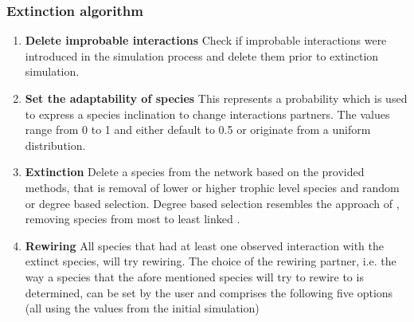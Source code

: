 \documentclass[12pt,a4paper]{article}
\begin{document}
\subsubsection{Extinction algorithm} \label{subsec:extc_alg}
\begin{enumerate} 
	\item \textbf{Delete improbable interactions} {\small Check if improbable interactions were introduced in the simulation process and delete them prior to extinction simulation.}
	\item \textbf{Set the adaptability of species} {\small This represents a probability which is used to express a species inclination to change interactions partners. The values range from 0 to 1 and either default to 0.5 or originate from a uniform distribution.}
	\item \label{itm:etxc} \textbf{Extinction} {\small Delete a species from the network based on the provided methods, that is removal of lower or higher trophic level species and random or degree based selection. Degree based selection resembles the approach of \citeauthor{Memmott2004}, removing species from most to least linked \parencite{Memmott2004}.}
	\item \label{itm:rew} \textbf{Rewiring} {\small All species that had at least one observed interaction with the extinct species, will try rewiring. The choice of the rewiring partner, i.e. the way a species that the afore mentioned species will try to rewire to is determined, can be set by the user and comprises the following five options (all using the values from the initial simulation)}

\end{enumerate}
\end{document}
